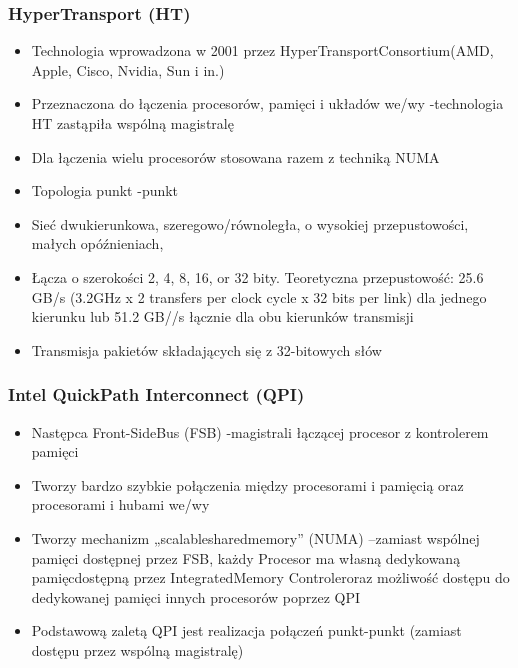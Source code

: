 		\subsubsection{HyperTransport (HT)}
			\begin{itemize}
				\item Technologia wprowadzona w 2001 przez HyperTransportConsortium(AMD, Apple, Cisco, Nvidia, Sun i in.)
				\item Przeznaczona do łączenia procesorów, pamięci i układów we/wy -technologia HT zastąpiła wspólną magistralę
				\item Dla łączenia wielu procesorów stosowana razem z techniką NUMA
				\item Topologia punkt -punkt
				\item Sieć dwukierunkowa, szeregowo/równoległa, o wysokiej przepustowości, małych opóźnieniach,
				\item Łącza o szerokości 2, 4, 8, 16, or 32 bity. Teoretyczna przepustowość: 25.6 GB/s (3.2GHz x 2 transfers per clock cycle x 32 bits per link) dla jednego kierunku lub 51.2 GB//s łącznie dla obu kierunków transmisji
				\item Transmisja pakietów składających się z 32-bitowych słów
			\end{itemize}
		\subsubsection{Intel QuickPath Interconnect (QPI)}
			\begin{itemize}
				\item Następca Front-SideBus (FSB) -magistrali łączącej procesor z kontrolerem pamięci
				\item Tworzy bardzo szybkie połączenia między procesorami i pamięcią oraz procesorami i hubami we/wy
				\item Tworzy mechanizm „scalablesharedmemory” (NUMA) –zamiast wspólnej pamięci dostępnej przez FSB, każdy Procesor ma własną dedykowaną pamięcdostępną przez IntegratedMemory Controleroraz możliwość dostępu do dedykowanej pamięci innych procesorów poprzez QPI
				\item Podstawową zaletą QPI jest realizacja połączeń punkt-punkt (zamiast dostępu przez wspólną magistralę)
			\end{itemize}
				
